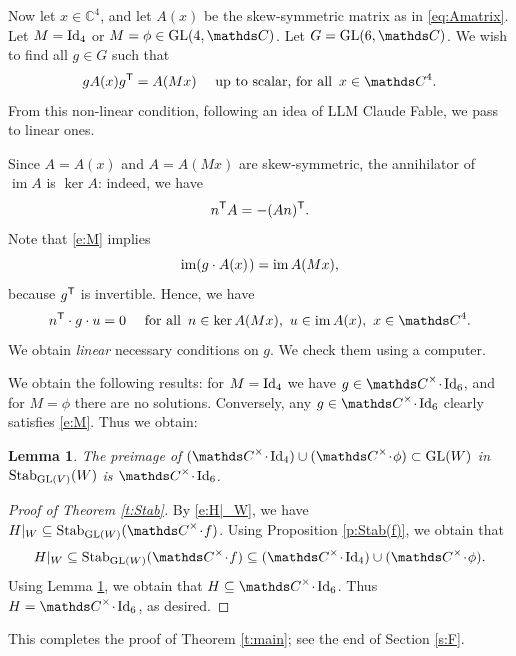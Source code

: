 \documentclass[11pt]{amsart}
\theoremstyle{plain}
\newtheorem{lemma}[theorem]{Lemma}
\theoremstyle{definition}
\newcommand{\hs}{\kern 0.8pt}
\newcommand{\C}{{\mathds C}}
\newcommand{\GL}{{\rm GL}}
\newcommand{\Stab}{{\rm Stab}}
\newcommand{\Id}{{\rm Id}}
\newcommand{\im}{\operatorname{im}}
\newcommand{\TT}{{\sf T}}
\newcommand{\scdot}{\!\cdot\!}
\begin{document}
Now  let $x\in\C^4$, and let $A(x)$ be the skew-symmetric matrix as in \eqref{eq:Amatrix}.
Let $M=\Id_4$ or $M=\phi\in\GL(4,\C)$.
Let $G=\GL(6,\C)$.
We wish to find all $g\in G$ such that
\begin{equation}\label{e:M}
g A(x) g^\TT=A(Mx)\quad\ \text{up to scalar, for all}\ \, x\in\C^4.
\end{equation}
From this non-linear condition, following an idea of LLM Claude Fable, we pass to linear ones.

Since $A=A(x)$ and $A=A(Mx)$ are skew-symmetric,
the annihilator of $\im A$ is $\ker A$: indeed, we have
\[ n^\TT A=-(An)^\TT.\]
Note that \eqref{e:M} implies
\[\im(g\cdot A(x)\hs)=\im A(Mx),\]
because $g^\TT$ is invertible.
Hence, we have
\[ n^\TT\cdot g\cdot u=0\quad\ \text{for all}\ \, n\in \ker A(Mx),\ u\in \im A(x),\ x\in \C^4.\]
We obtain {\em linear} necessary conditions on $g$. We check them using a computer.

We obtain the following results:
for $M=\Id_4$ we have $g\in \C^\times\scdot\hs \Id_6$, and for $M=\phi$ there are no solutions.
Conversely, any $g\in \C^\times\scdot\hs \Id_6$ clearly satisfies \eqref{e:M}.
Thus we obtain:

\begin{lemma}\label{l:M}
The preimage of $(\C^\times\scdot\hs\Id_4)\cup(\C^\times\scdot \phi)\subset \GL(W)$
in $\Stab_{\GL(V)}(W)$ is $\C^\times\scdot\hs \Id_6$.
\end{lemma}

\begin{proof}[Proof of Theorem \ref{t:Stab}]
By \eqref{e:H|_W}, we have $H|_W\subseteq \Stab_{\GL(W)}(\C^\times\scdot f)$.
Using  Proposition \ref{p:Stab(f)}, we obtain that
\[H|_W\subseteq\Stab_{\GL(W)}(\C^\times\scdot f)\subseteq (\C^\times\scdot\hs\Id_4)\cup(\C^\times\scdot \phi).\]
Using Lemma \ref{l:M}, we obtain that $H\subseteq \C^\times\scdot\hs \Id_6$.
Thus $H= \C^\times\scdot\hs \Id_6$\hs, as desired.
\end{proof}

This completes the proof of  Theorem \ref{t:main}; see the end of Section \ref{s:F}.
\end{document}
